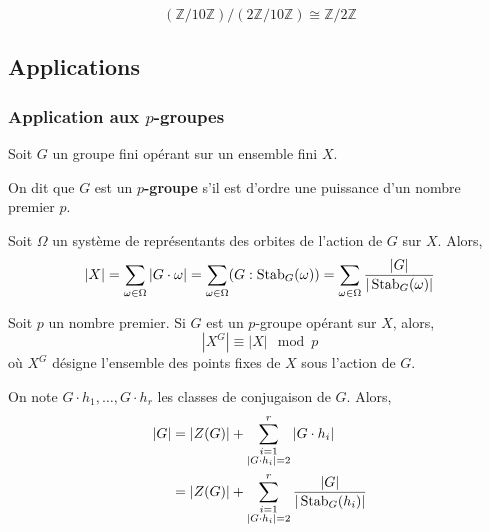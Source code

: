   \begin{example}
    \[ (\mathbb{Z}/10\mathbb{Z})/(2\mathbb{Z}/10\mathbb{Z}) \cong \mathbb{Z}/2\mathbb{Z} \]
  \end{example}

  \subsection{Applications}

  \subsubsection{Application aux \texorpdfstring{$p$}{p}-groupes}


  Soit $G$ un groupe fini opérant sur un ensemble fini $X$.

  \begin{definition}
    On dit que $G$ est un \textbf{$p$-groupe} s'il est d'ordre une puissance d'un nombre premier $p$.
  \end{definition}

  \begin{theorem}
    Soit $\Omega$ un système de représentants des orbites de l'action de $G$ sur $X$. Alors,
    \[ |X| = \sum_{\omega \in \Omega} |G \cdot \omega| = \sum_{\omega \in \Omega} (G : \operatorname{Stab}_G(\omega)) = \sum_{\omega \in \Omega} \frac{|G|}{|\operatorname{Stab}_G(\omega)|} \]
  \end{theorem}

  \begin{corollary}
    Soit $p$ un nombre premier. Si $G$ est un $p$-groupe opérant sur $X$, alors,
    \[ |X^G| \equiv |X| \mod p \]
    où $X^G$ désigne l'ensemble des points fixes de $X$ sous l'action de $G$.
  \end{corollary}

  \begin{corollary}
    On note $G \cdot h_1, \dots, G \cdot h_r$ les classes de conjugaison de $G$. Alors,
    \begin{align*}
      \vert G \vert &= \vert Z(G) \vert + \sum_{\substack{i=1 \\ \vert G \cdot h_i \vert = 2}}^{r} \vert G \cdot h_i \vert \\
      &= \vert Z(G) \vert + \sum_{\substack{i=1 \\ \vert G \cdot h_i \vert = 2}}^{r} \frac{\vert G \vert}{\vert \operatorname{Stab}_G(h_i) \vert}
    \end{align*}
  \end{corollary}

